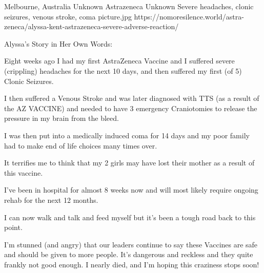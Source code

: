 {Melbourne, Australia}
{Unknown}
{Astrazeneca}
{Unknown}
{Severe headaches, clonic seizures, venous stroke, coma}
{picture.jpg}
{https://nomoresilence.world/astra-zeneca/alyssa-kent-astrazeneca-severe-adverse-reaction/}
{

Alyssa’s Story in Her Own Words:

Eight weeks ago I had my first AstraZeneca Vaccine and I suffered severe
(crippling) headaches for the next 10 days, and then suffered my first (of 5)
Clonic Seizures.

I then suffered a Venous Stroke and was later diagnosed with TTS (as a result of
the AZ VACCINE) and needed to have 3 emergency Craniotomies to release the
pressure in my brain from the bleed.

I was then put into a medically induced coma for 14 days and my poor family had
to make end of life choices many times over.

It terrifies me to think that my 2 girls may have lost their mother as a result
of this vaccine.

I’ve been in hospital for almost 8 weeks now and will most likely require
ongoing rehab for the next 12 months.

I can now walk and talk and feed myself but it’s been a tough road back to this
point.

I’m stunned (and angry) that our leaders continue to say these Vaccines are safe
and should be given to more people. It’s dangerous and reckless and they quite
frankly not good enough. I nearly died, and I’m hoping this craziness stops
soon!

}
